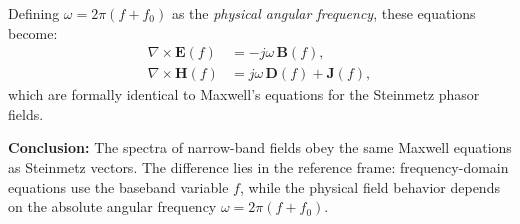 Defining $\omega = 2\pi(f+f_0)$ as the \emph{physical angular frequency}, these equations become:
\begin{align}
    \nabla\times\mathbf{E}(f) &= -j\omega\,\mathbf{B}(f),\\
    \nabla\times\mathbf{H}(f) &= j\omega\,\mathbf{D}(f) + \mathbf{J}(f),
\end{align}
which are formally identical to Maxwell’s equations for the Steinmetz phasor fields.

\begin{center}
\textbf{Conclusion:}  
The spectra of narrow-band fields obey the same Maxwell equations as Steinmetz vectors.  
The difference lies in the reference frame: frequency-domain equations use the baseband variable $f$,  
while the physical field behavior depends on the absolute angular frequency $\omega = 2\pi(f+f_0)$.
\end{center}


